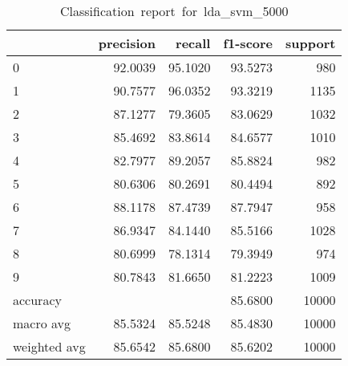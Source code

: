 \begin{table}[htb!]
    \centering
    \begin{tabular}{lrrrr}
        \toprule
                     & precision & recall  & f1-score & support \\
        \midrule
        0            & 92.0039   & 95.1020 & 93.5273  & 980     \\
        1            & 90.7577   & 96.0352 & 93.3219  & 1135    \\
        2            & 87.1277   & 79.3605 & 83.0629  & 1032    \\
        3            & 85.4692   & 83.8614 & 84.6577  & 1010    \\
        4            & 82.7977   & 89.2057 & 85.8824  & 982     \\
        5            & 80.6306   & 80.2691 & 80.4494  & 892     \\
        6            & 88.1178   & 87.4739 & 87.7947  & 958     \\
        7            & 86.9347   & 84.1440 & 85.5166  & 1028    \\
        8            & 80.6999   & 78.1314 & 79.3949  & 974     \\
        9            & 80.7843   & 81.6650 & 81.2223  & 1009    \\
        accuracy     &           &         & 85.6800  & 10000   \\
        macro avg    & 85.5324   & 85.5248 & 85.4830  & 10000   \\
        weighted avg & 85.6542   & 85.6800 & 85.6202  & 10000   \\
        \bottomrule
    \end{tabular}
    \caption{Classification\ report\ for\ lda\_svm\_5000}
    \label{tab:classification-report-lda_svm_5000}
\end{table}
